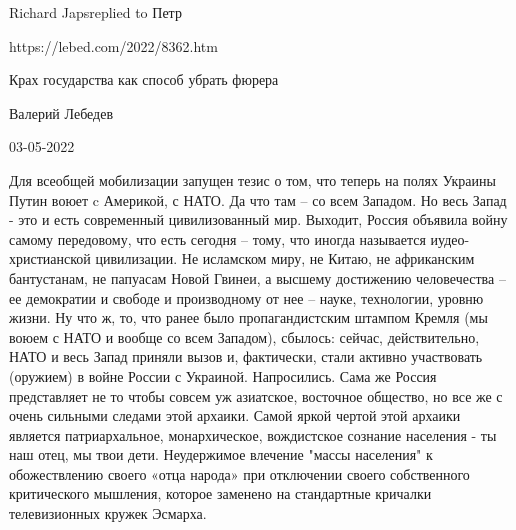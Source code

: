 Richard Japsreplied to Петр

https://lebed.com/2022/8362.htm

Крах государства как способ убрать фюрера

Валерий Лебедев

03-05-2022 

Для всеобщей мобилизации запущен тезис о том,
что
теперь на полях Украины Путин воюет c Америкой, с НАТО. Да что
там – со
всем Западом. Но весь Запад - это и есть современный
цивилизованный мир.
Выходит, Россия объявила войну самому передовому, что есть
сегодня –
тому, что иногда называется иудео-христианской цивилизации. Не
исламском миру,
не Китаю, не африканским бантустанам, не папуасам Новой Гвинеи, а
высшему
достижению человечества – ее демократии и свободе и производному
от нее –
науке, технологии, уровню жизни. Ну что ж, то, что ранее было
пропагандистским штампом Кремля (мы воюем с НАТО и вообще со всем
Западом),
сбылось: сейчас, действительно, НАТО и весь Запад приняли вызов и,
фактически,
стали активно участвовать (оружием) в войне России с Украиной.
Напросились.
Сама же Россия представляет не то чтобы совсем уж азиатское,
восточное
общество, но все же с очень сильными следами этой архаики. Самой
яркой
чертой этой архаики является патриархальное, монархическое,
вождистское
сознание населения - ты наш отец, мы твои дети. Неудержимое
влечение
"массы населения" к обожествлению своего «отца народа» при
отключении
своего собственного критического мышления, которое заменено на
стандартные кричалки телевизионных кружек Эсмарха.
